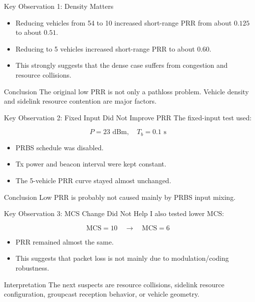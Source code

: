 \documentclass[aspectratio=169,11pt]{beamer}
\begin{document}
\begin{frame}{Key Observation 1: Density Matters}
\large
\begin{itemize}
  \item Reducing vehicles from 54 to 10 increased short-range PRR from about \(0.125\) to about \(0.51\).
  \item Reducing to 5 vehicles increased short-range PRR to about \(0.60\).
  \item This strongly suggests that the dense case suffers from congestion and resource collisions.
\end{itemize}

\vspace{0.25cm}
\begin{block}{Conclusion}
The original low PRR is not only a pathloss problem. Vehicle density and sidelink resource contention are major factors.
\end{block}
\end{frame}

\begin{frame}{Key Observation 2: Fixed Input Did Not Improve PRR}
\large
The fixed-input test used:

\[
P = 23 \text{ dBm}, \quad T_b = 0.1 \text{ s}
\]

\vspace{0.2cm}
\begin{itemize}
  \item PRBS schedule was disabled.
  \item Tx power and beacon interval were kept constant.
  \item The 5-vehicle PRR curve stayed almost unchanged.
\end{itemize}

\vspace{0.25cm}
\begin{block}{Conclusion}
Low PRR is probably not caused mainly by PRBS input mixing.
\end{block}
\end{frame}

\begin{frame}{Key Observation 3: MCS Change Did Not Help}
\large
I also tested lower MCS:

\[
\mathrm{MCS}=10 \quad \rightarrow \quad \mathrm{MCS}=6
\]

\vspace{0.2cm}
\begin{itemize}
  \item PRR remained almost the same.
  \item This suggests that packet loss is not mainly due to modulation/coding robustness.
\end{itemize}

\vspace{0.25cm}
\begin{block}{Interpretation}
The next suspects are resource collisions, sidelink resource configuration, groupcast reception behavior, or vehicle geometry.
\end{block}
\end{frame}
\end{document}
